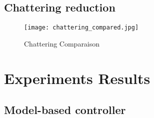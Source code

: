 \subsection{Chattering reduction}


\begin{figure}[htp]
	\centering
		\texttt{[image: chattering\_compared.jpg]}
	\caption[Chattering Comparaison]{Chattering Comparaison}
	\label{fig:ChatteringComparaison}
\end{figure}



\newpage
\section{Experiments Results}
\label{sec:shift_exp}

\subsection{Model-based controller}

